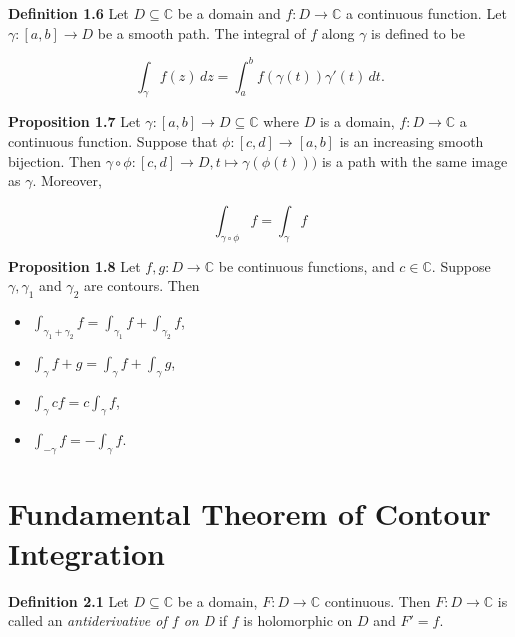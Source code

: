 \documentclass{article}
\begin{document}
\bigskip

\textbf{Definition 1.6} Let $D \subseteq \mathbb{C}$ be a domain and $f: D \rightarrow \mathbb{C}$ a continuous function. Let $\gamma:[a,b] \rightarrow D$ be a smooth path. The integral of $f$ along $\gamma$ is defined to be 

\begin{equation}
    \int_{\gamma} f(z) \, dz = \int_{a}^{b} f(\gamma(t))\gamma'(t) \, dt.
\end{equation}

\bigskip

\textbf{Proposition 1.7} Let $\gamma:[a,b] \rightarrow D \subseteq \mathbb{C}$ where $D$ is a domain, $f: D \rightarrow \mathbb{C}$ a continuous function. Suppose that $\phi:[c,d] \rightarrow [a,b]$ is an increasing smooth bijection. Then $\gamma \circ \phi : [c,d] \rightarrow D, t\mapsto \gamma(\phi(t)))$ is a path with the same image as $\gamma.$ Moreover, 

\begin{equation}
    \int_{\gamma \circ \phi} f = \int_{\gamma} f
\end{equation}

\bigskip

\textbf{Proposition 1.8} Let $f, g : D \rightarrow \mathbb{C}$ be continuous functions, and $c \in \mathbb{C}.$ Suppose $\gamma, \gamma_1$ and $\gamma_2$ are contours. Then

\begin{itemize}
    \item $\int_{\gamma_1 + \gamma_2} f = \int_{\gamma_1} f + \int_{\gamma_2} f$,
    \item $\int_{\gamma} f + g = \int_{\gamma} f + \int_{\gamma} g$,
    \item $\int_{\gamma} cf = c \int_{\gamma} f$,
    \item $\int_{-\gamma} f = - \int_{\gamma} f$.
\end{itemize}

\bigskip

\section{Fundamental Theorem of Contour Integration}

\textbf{Definition 2.1} Let $D \subseteq \mathbb{C}$ be a domain, $F: D \rightarrow \mathbb{C}$ continuous. Then $F: D \rightarrow \mathbb{C}$ is called an {\it{antiderivative of $f$ on D}} if $f$ is holomorphic on $D$ and $F' = f.$
\end{document}
